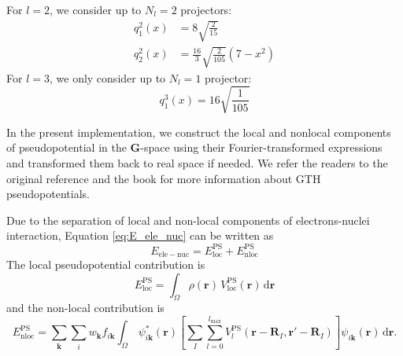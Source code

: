 %
For $l=2$, we consider up to $N_{l}=2$ projectors:
\begin{align}
q^{2}_{1}(x) & = 8\sqrt{\frac{2}{15}} \\
q^{2}_{2}(x) & = \frac{16}{3} \sqrt{\frac{2}{105}}(7 - x^2)
\end{align}
%
For $l=3$, we only consider up to $N_{l}=1$ projector:
\begin{equation}
q^{3}_{1}(x) = 16\sqrt{\frac{1}{105}}
\end{equation}

In the present implementation, we construct the local and nonlocal
components of pseudopotential in the $\mathbf{G}$-space using
their Fourier-transformed expressions
and transformed them back to real space if needed.
We refer the readers to the original
reference \cite{Goedecker1996} and the book \cite{Marx2009}
for more information about GTH pseudopotentials.

Due to the separation of local and non-local components of electrons-nuclei
interaction, Equation \eqref{eq:E_ele_nuc} can be written as
\begin{equation}
E_{\mathrm{ele-nuc}} = E^{\mathrm{PS}}_{\mathrm{loc}}
+ E^{\mathrm{PS}}_{\mathrm{nloc}}
\end{equation}
%
The local pseudopotential contribution is
\begin{equation}
E^{\mathrm{PS}}_{\mathrm{loc}} =
\int_{\Omega} \rho(\mathbf{r})\,V^{\mathrm{PS}}_{\mathrm{loc}}(\mathbf{r})\,
\mathrm{d}\mathbf{r}
\end{equation}
%
and the non-local contribution is
\begin{equation}
E^{\mathrm{PS}}_{\mathrm{nloc}} =
\sum_{\mathbf{k}}
\sum_{i}
w_{\mathbf{k}}
f_{i\mathbf{k}}
\int_{\Omega}\,
\psi^{*}_{i\mathbf{k}}(\mathbf{r})
\left[
\sum_{I}\sum_{l=0}^{l_{\mathrm{max}}}
V^{\mathrm{PS}}_{l}(\mathbf{r}-\mathbf{R}_{I},\mathbf{r}'-\mathbf{R}_{I})
\right]
\psi_{i\mathbf{k}}(\mathbf{r})
\,\mathrm{d}\mathbf{r}.
\end{equation}
